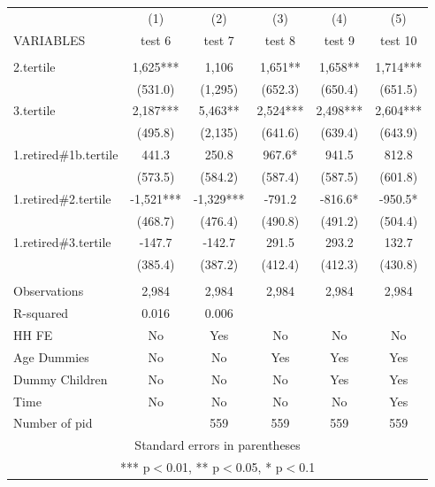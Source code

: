 \begin{tabular}{lccccc} \hline
 & (1) & (2) & (3) & (4) & (5) \\
VARIABLES & test 6 & test 7 & test 8 & test 9 & test 10 \\ \hline
 &  &  &  &  &  \\
2.tertile & 1,625*** & 1,106 & 1,651** & 1,658** & 1,714*** \\
 & (531.0) & (1,295) & (652.3) & (650.4) & (651.5) \\
3.tertile & 2,187*** & 5,463** & 2,524*** & 2,498*** & 2,604*** \\
 & (495.8) & (2,135) & (641.6) & (639.4) & (643.9) \\
1.retired\#1b.tertile & 441.3 & 250.8 & 967.6* & 941.5 & 812.8 \\
 & (573.5) & (584.2) & (587.4) & (587.5) & (601.8) \\
1.retired\#2.tertile & -1,521*** & -1,329*** & -791.2 & -816.6* & -950.5* \\
 & (468.7) & (476.4) & (490.8) & (491.2) & (504.4) \\
1.retired\#3.tertile & -147.7 & -142.7 & 291.5 & 293.2 & 132.7 \\
 & (385.4) & (387.2) & (412.4) & (412.3) & (430.8) \\
 &  &  &  &  &  \\
Observations & 2,984 & 2,984 & 2,984 & 2,984 & 2,984 \\
R-squared & 0.016 & 0.006 &  &  &  \\
HH FE & No & Yes & No & No & No \\
Age Dummies & No & No & Yes & Yes & Yes \\
Dummy Children & No & No & No & Yes & Yes \\
Time & No & No & No & No & Yes \\
 Number of pid &  & 559 & 559 & 559 & 559 \\ \hline
\multicolumn{6}{c}{ Standard errors in parentheses} \\
\multicolumn{6}{c}{ *** p$<$0.01, ** p$<$0.05, * p$<$0.1} \\
\end{tabular}
